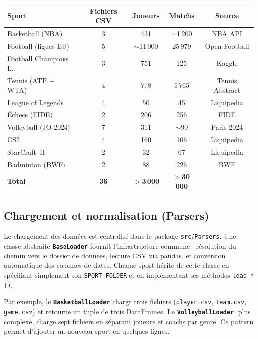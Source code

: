 \documentclass[12pt,a4paper]{article}
\newcommand{\code}[1]{\texttt{#1}}
\newcommand{\fichier}[1]{\texttt{#1}}
\newcommand{\classe}[1]{\texttt{\textbf{#1}}}
\begin{document}
\begin{center}
\begin{tabular}{lcccc}
  \toprule
  \textbf{Sport} & \textbf{Fichiers CSV} & \textbf{Joueurs} & \textbf{Matchs} & \textbf{Source} \\
  \midrule
  Basketball (NBA)      & 3 & 431     & $\sim$1\,200 & NBA API \\
  Football (ligues EU)  & 5 & $\sim$11\,000 & 25\,979 & Open Football \\
  Football Champions L. & 3 & 751     & 125    & Kaggle \\
  Tennis (ATP + WTA)    & 4 & 778     & 5\,765 & Tennis Abstract \\
  League of Legends     & 4 & 50      & 45     & Liquipedia \\
  Échecs (FIDE)         & 2 & 206     & 256    & FIDE \\
  Volleyball (JO 2024)  & 7 & 311     & $\sim$90  & Paris 2024 \\
  CS2                   & 4 & 160     & 106    & Liquipedia \\
  StarCraft~II          & 2 & 32      & 67     & Liquipedia \\
  Badminton (BWF)       & 2 & 88      & 226    & BWF \\
  \midrule
  \textbf{Total}        & \textbf{36} & \textbf{$>$3\,000} & \textbf{$>$30\,000} & \\
  \bottomrule
\end{tabular}
\end{center}

\subsection{Chargement et normalisation (Parsers)}

Le chargement des données est centralisé dans le package \fichier{src/Parsers}. Une
classe abstraite \classe{BaseLoader} fournit l'infrastructure commune : résolution du chemin
vers le dossier de données, lecture CSV via pandas, et conversion automatique des colonnes
de dates. Chaque sport hérite de cette classe en spécifiant simplement son
\code{SPORT\_FOLDER} et en implémentant ses méthodes \code{load\_*()}.

Par exemple, le \classe{BasketballLoader} charge trois fichiers (\fichier{player.csv},
\fichier{team.csv}, \fichier{game.csv}) et retourne un tuple de trois DataFrames.
Le \classe{VolleyballLoader}, plus complexe, charge sept fichiers en séparant joueurs
et coachs par genre. Ce pattern permet d'ajouter un nouveau sport en quelques lignes.
\end{document}
